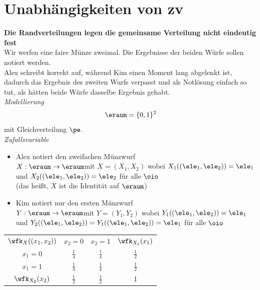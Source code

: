 

\chapter{Unabhängigkeiten von \gls{zv}}\label{ch:unabhangigkeiten-von-zv}
\begin{bsp}
    \textbf{Die Randverteilungen legen die gemeinsame Verteilung nicht eindeutig fest}   \\
    Wir werfen eine faire Münze zweimal.
    Die Ergebnisse der beiden Würfe sollen notiert werden. \\
    Alex schreibt korrekt auf, während Kim einen Moment lang abgelenkt ist, dadurch das Ergebnis des
    zweiten Wurfs verpasst und als Notlösung einfach so tut, als hätten beide Würfe dasselbe Ergebnis
    gehabt. \\
    \textit{Modellierung}
    \[
        \eraum = \{0,1\}^2
    \]
    mit Gleichverteilung $\pe$. \\
    \textit{Zufallsvariable}
    \begin{itemize}
        \item Alex notiert den zweifachen Münzwurf \\ $X : \eraum \rightarrow \eraum$mit $X = (X_1, X_2)$ wobei
        $X_1((\ele_1, \ele_2)) = \ele_1$ und $X_2((\ele_1, \ele_2)) = \ele_2$ für alle $\oio$ \\ (das heißt,
        $X$ ist die Identität auf $\eraum$)
        \item Kim notiert nur den ersten Münzwurf \\ $Y : \eraum \rightarrow \eraum$mit $Y = (Y_1, Y_2)$ wobei
        $Y_1((\ele_1, \ele_2)) = \ele_1$ und $Y_2((\ele_1, \ele_2)) = Y_1((\ele_1, \ele_2)) = \ele_1$ für alle $\oio$
    \end{itemize}
    \begin{table}[H]
        \begin{tabular}{cccc}
            $\wfk_X ((x_1, x_2))$ & $x_2 = 0$     & $x_2 = 1$     & $\wfk_{X_1}(x_1)$ \\
            $x_1 = 0$             & $\frac{1}{4}$ & $\frac{1}{4}$ & $\frac{1}{2}$     \\
            $x_1 = 1$             & $\frac{1}{4}$ & $\frac{1}{4}$ & $\frac{1}{2}$     \\
            $\wfk_{X_2}(x_2)$     & $\frac{1}{2}$ & $\frac{1}{2}$ & 1
        \end{tabular}


\end{table}
\end{bsp}
